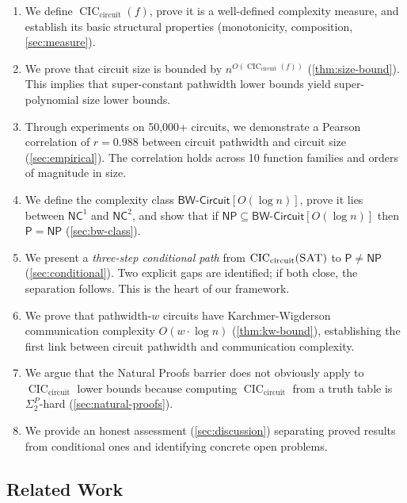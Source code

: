 \documentclass[11pt]{article}
\theoremstyle{plain}
\theoremstyle{definition}
\newcommand{\CIC}{\operatorname{CIC}}
\newcommand{\CICcirc}{\CIC_{\text{circuit}}}
\newcommand{\SAT}{\textsc{SAT}}
\newcommand{\Pclass}{\mathsf{P}}
\newcommand{\NP}{\mathsf{NP}}
\newcommand{\NC}{\mathsf{NC}}
\newcommand{\BWCircuit}{\mathsf{BW\text{-}Circuit}}
\begin{document}
\begin{enumerate}[label=\arabic*.]
    \item We define $\CICcirc(f)$, prove it is a well-defined complexity measure, and establish its basic structural properties (monotonicity, composition, \cref{sec:measure}).
    
    \item We prove that circuit size is bounded by $n^{O(\CICcirc(f))}$ (\cref{thm:size-bound}). This implies that super-constant pathwidth lower bounds yield super-polynomial size lower bounds.
    
    \item Through experiments on 50{,}000+ circuits, we demonstrate a Pearson correlation of $r = 0.988$ between circuit pathwidth and circuit size (\cref{sec:empirical}). The correlation holds across 10 function families and orders of magnitude in size.
    
    
    \item We define the complexity class $\BWCircuit[O(\log n)]$, prove it lies between $\NC^1$ and $\NC^2$, and show that if $\NP \subseteq \BWCircuit[O(\log n)]$ then $\Pclass = \NP$ (\cref{sec:bw-class}).
    
    
    \item We present a \emph{three-step conditional path} from $\CICcirc(\SAT)$ to $\Pclass \neq \NP$ (\cref{sec:conditional}). Two explicit gaps are identified; if both close, the separation follows. This is the heart of our framework.
    
    
    \item We prove that pathwidth-$w$ circuits have Karchmer-Wigderson communication complexity $O(w \cdot \log n)$ (\cref{thm:kw-bound}), establishing the first link between circuit pathwidth and communication complexity.
    
    \item We argue that the Natural Proofs barrier does not obviously apply to $\CICcirc$ lower bounds because computing $\CICcirc$ from a truth table is $\Sigma_2^P$-hard (\cref{sec:natural-proofs}).
    
    \item We provide an honest assessment (\cref{sec:discussion}) separating proved results from conditional ones and identifying concrete open problems.
\end{enumerate}

\subsection{Related Work}
\end{document}
